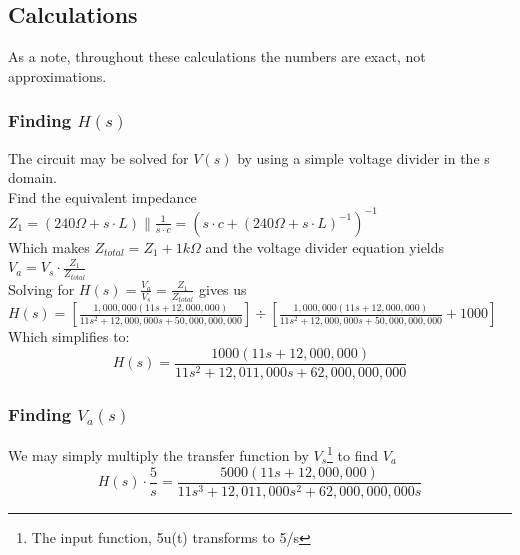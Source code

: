 \documentclass[11pt]{article}
\begin{document}
	
	\subsection*{Calculations}
	As a note, throughout these calculations the numbers are exact, not approximations. 
	\subsubsection*{Finding $H(s)$}
	The circuit may be solved for $V(s)$ by using a simple voltage divider in the s domain.\\ 
	Find the equivalent impedance $Z_1= (240 \Omega + s \cdot L) \parallel \frac{1}{s\cdot c} = (s\cdot c+(240 \Omega + s \cdot L)^{-1})^{-1}$ \\
	Which makes $Z_{total}=Z_1+1k\Omega$ and the voltage divider equation yields $V_a=V_s\cdot \frac{Z_1}{Z_{total}}$\\
	Solving for $H(s)=\frac{V_a}{V_s}=\frac{Z_1}{Z_{total}}$ gives us\\
	$ H(s)= \left[\frac{1,000,000(11s+12,000,000)}{11s^2+12,000,000s+50,000,000,000}\right] \div \left[ \frac{1,000,000(11s+12,000,000)}{11s^2+12,000,000s+50,000,000,000}+1000\right]$\\
	Which simplifies to:
	\[ H(s)= \frac{1000(11s+12,000,000)}{11s^2+12,011,000s+62,000,000,000} \]
	\subsubsection*{Finding $V_a(s)$}
	We may simply multiply the transfer function by $V_s$\footnote{The input function, 5u(t) transforms to 5/s} to find $V_a$\\
	\[ H(s) \cdot \frac{5}{s}= \frac{5000(11s+12,000,000)}{11s^3+12,011,000s^2+62,000,000,000s} \]
	\newpage
\end{document}
